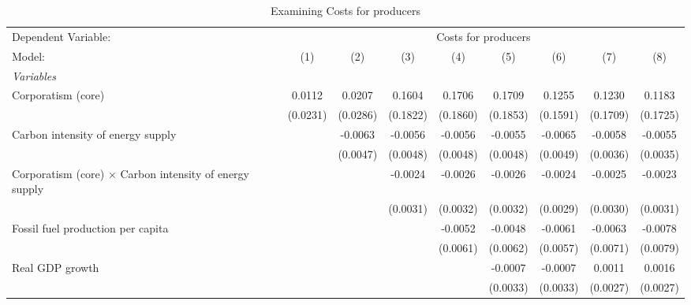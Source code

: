 
\begin{table}[htbp]
   \caption{Examining Costs for producers}
   \centering
   \begin{tabular}{lcccccccc}
      \tabularnewline \midrule \midrule
      Dependent Variable: & \multicolumn{8}{c}{Costs for producers}\\
      Model:                                                         & (1)      & (2)      & (3)      & (4)      & (5)      & (6)      & (7)      & (8)\\  
      \midrule
      \emph{Variables}\\
      Corporatism (core)                                             & 0.0112   & 0.0207   & 0.1604   & 0.1706   & 0.1709   & 0.1255   & 0.1230   & 0.1183\\   
                                                                     & (0.0231) & (0.0286) & (0.1822) & (0.1860) & (0.1853) & (0.1591) & (0.1709) & (0.1725)\\   
      Carbon intensity of energy supply                              &          & -0.0063  & -0.0056  & -0.0056  & -0.0055  & -0.0065  & -0.0058  & -0.0055\\   
                                                                     &          & (0.0047) & (0.0048) & (0.0048) & (0.0048) & (0.0049) & (0.0036) & (0.0035)\\   
      Corporatism (core) $\times$ Carbon intensity of energy supply  &          &          & -0.0024  & -0.0026  & -0.0026  & -0.0024  & -0.0025  & -0.0023\\   
                                                                     &          &          & (0.0031) & (0.0032) & (0.0032) & (0.0029) & (0.0030) & (0.0031)\\   
      Fossil fuel production per capita                              &          &          &          & -0.0052  & -0.0048  & -0.0061  & -0.0063  & -0.0078\\   
                                                                     &          &          &          & (0.0061) & (0.0062) & (0.0057) & (0.0071) & (0.0079)\\   
      Real GDP growth                                                &          &          &          &          & -0.0007  & -0.0007  & 0.0011   & 0.0016\\   
                                                                     &          &          &          &          & (0.0033) & (0.0033) & (0.0027) & (0.0027)\\   

\end{tabular}
\end{table}
